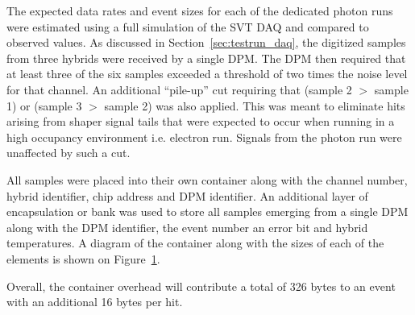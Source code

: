 
%
%

The expected data rates and event sizes for each of the dedicated photon runs
were estimated using a full simulation of the SVT DAQ and compared to observed
values. As discussed in Section~\ref{sec:testrun_daq}, the digitized samples
from three hybrids were received by a single DPM.  The DPM then required that
at least three of the six samples exceeded a threshold of two times the noise
level for that channel.  An additional ``pile-up'' cut requiring that 
(sample 2 $>$ sample 1) or (sample 3 $>$ sample 2) was also applied. This was
meant to eliminate hits arising from shaper signal tails that were expected
to occur when running in a high occupancy environment i.e. electron run.
Signals from the photon run were unaffected by such a cut. 

All samples were placed into their own container along with the 
channel number, hybrid identifier, chip address and DPM identifier. An 
additional layer of encapsulation or bank was used to store all samples 
emerging from a single DPM along with the DPM identifier, the event number
an error bit and hybrid temperatures. A diagram of the container along with
the sizes of each of the elements is shown on Figure~\ref{fig:data_format}.
\begin{figure}[h]
    \begin{center}
        \caption{
                 } 
	\label{fig:data_format}
    \end{center}
\end{figure}
Overall, the container overhead will contribute a total of 326 bytes to an event
with an additional 16 bytes per hit.

